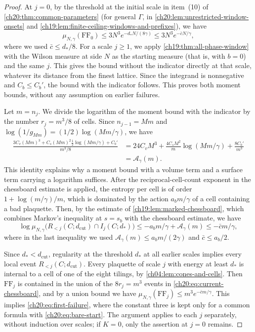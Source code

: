 \begin{proof}
At $j=0$, by the threshold at the initial scale in item~(10) of \cref{ch20:thm:common-parameters} (for general $\Gamma$, in \cref{ch20:lem:unrestricted-window-onsets} and \cref{ch19:lem:finite-ceiling-windows-and-prefixes}), we have
\begin{equation}\label{ch20:eq:bare-start}
 \mu_{N,\gamma}(\mathrm{FF}_0)\le3N^3e^{-d_*N/(8\gamma)}\le3N^3e^{-\bar cN/\gamma},
\end{equation}
where we used $\bar c\le d_*/8$. For a scale $j\ge1$, we apply \cref{ch19:thm:all-phase-window} with the Wilson measure at side $N$ as the starting measure (that is, with $b=0$) and the same $j$. This gives the bound without the indicator directly at that scale, whatever its distance from the finest lattice. Since the integrand is nonnegative and $C_b\le C_b'$, the bound with the indicator follows. This proves both moment bounds, without any assumption on earlier failures.

Let $m=n_j$. We divide the logarithm of the moment bound with the indicator by the number $r_j=m^3/8$ of cells. Since $n_{j-1}=Mm$ and $\log(1/g_{Mm})=(1/2)\log(Mm/\gamma)$, we have
\[
 \begin{split}
 \frac{3C_v(Mm)^3+C_s(Mm)^2\frac12\log(Mm/\gamma)+C_b'}{m^3/8}
 &=24C_vM^3+\frac{4C_sM^2}{m}\log(Mm/\gamma)+\frac{8C_b'}{m^3}\\
 &=\mathcal A_\gamma(m).
 \end{split}
\]
This identity explains why a moment bound with a volume term and a surface term carrying a logarithm suffices. After the reciprocal-cell-count exponent in the chessboard estimate is applied, the entropy per cell is of order $1+\log(m/\gamma)/m$, which is dominated by the action $a_bm/\gamma$ of a cell containing a bad plaquette. Then, by the estimate of \cref{ch19:lem:marked-chessboard}, which combines Markov's inequality at $s=s_b$ with the chessboard estimate, we have
\begin{equation}\label{ch20:eq:current-chessboard}
 \log\mu_{N,\gamma}\bigl(R_{<j}(C;d_{\mathrm{cut}})\cap I_j(C;d_*)\bigr)
 \le-a_bm/\gamma+\mathcal A_\gamma(m)\le-\bar cm/\gamma,
\end{equation}
where in the last inequality we used $\mathcal A_\gamma(m)\le a_bm/(2\gamma)$ and $\bar c\le a_b/2$.

Since $d_*<d_{\mathrm{cut}}$, regularity at the threshold $d_*$ at all earlier scales implies every local event $R_{<j}(C;d_{\mathrm{cut}})$. Every plaquette of scale $j$ with energy at least $d_*$ is internal to a cell of one of the eight tilings, by \cref{ch04:lem:cones-and-cells}. Then $\mathrm{FF}_j$ is contained in the union of the $8r_j=m^3$ events in \eqref{ch20:eq:current-chessboard}, and by a union bound we have $\mu_{N,\gamma}(\mathrm{FF}_j)\le m^3e^{-\bar cm/\gamma}$. This implies \eqref{ch20:eq:first-failure}, where the constant three is kept only for a common formula with \eqref{ch20:eq:bare-start}. The argument applies to each $j$ separately, without induction over scales; if $K=0$, only the assertion at $j=0$ remains.
\end{proof}

